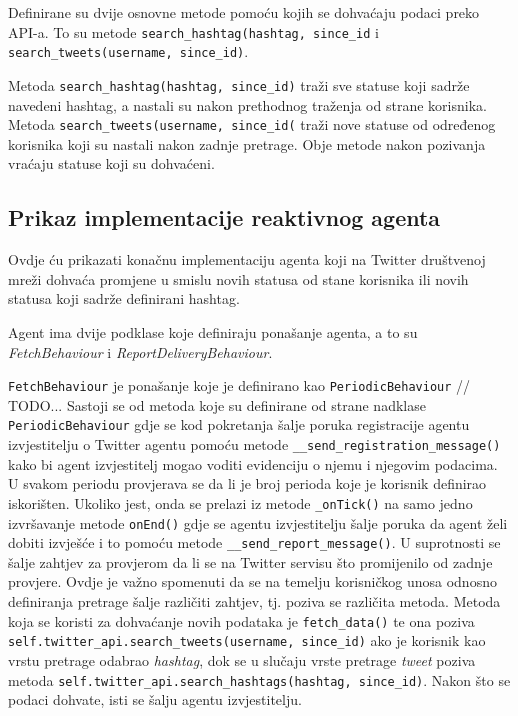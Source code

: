 \documentclass[a4paper,12pt]{foi}
\begin{document}
\lstset{commentstyle=\textit,language=python}


Definirane su dvije osnovne metode pomoću kojih se dohvaćaju podaci preko API-a. To su metode \texttt{search\_hashtag(hashtag, since\_id} i \texttt{search\_tweets(username, since\_id)}.

Metoda \texttt{search\_hashtag(hashtag, since\_id)} traži sve statuse koji sadrže navedeni hashtag, a nastali su nakon prethodnog traženja od strane korisnika. Metoda \texttt{search\_tweets(username, since\_id(} traži nove statuse od određenog korisnika koji su nastali nakon zadnje pretrage. Obje metode nakon pozivanja vraćaju statuse koji su dohvaćeni.

\subsection{Prikaz implementacije reaktivnog agenta}

Ovdje ću prikazati konačnu implementaciju agenta koji na Twitter društvenoj mreži dohvaća promjene u smislu novih statusa od stane korisnika ili novih statusa koji sadrže definirani hashtag.

\lstset{commentstyle=\textit,language=python}


Agent ima dvije podklase koje definiraju ponašanje agenta, a to su \textit{FetchBehaviour} i \textit{ReportDeliveryBehaviour}.

\texttt{FetchBehaviour} je ponašanje koje je definirano kao \texttt{PeriodicBehaviour} // TODO... Sastoji se od metoda koje su definirane od strane nadklase \texttt{PeriodicBehaviour} gdje se kod pokretanja šalje poruka registracije agentu izvjestitelju o Twitter agentu pomoću metode \texttt{\_\_send\_registration\_message()}  kako bi agent izvjestitelj mogao voditi evidenciju o njemu i njegovim podacima. U svakom periodu provjerava se da li je broj perioda koje je korisnik definirao iskorišten. Ukoliko jest, onda se prelazi iz metode \texttt{\_onTick()} na samo jedno izvršavanje metode \texttt{onEnd()} gdje se agentu izvjestitelju šalje poruka da agent želi dobiti izvješće i to pomoću metode \texttt{\_\_send\_report\_message()}. U suprotnosti se šalje zahtjev za provjerom da li se na Twitter servisu što promijenilo od zadnje provjere. Ovdje je važno spomenuti da se na temelju korisničkog unosa odnosno definiranja pretrage šalje različiti zahtjev, tj. poziva se različita metoda. Metoda koja se koristi za dohvaćanje novih podataka je \texttt{fetch\_data()} te ona poziva \texttt{self.twitter\_api.search\_tweets(username, since\_id)} ako je korisnik kao vrstu pretrage odabrao \textit{hashtag}, dok se u slučaju vrste pretrage \textit{tweet} poziva metoda \texttt{self.twitter\_api.search\_hashtags(hashtag, since\_id)}. Nakon što se podaci dohvate, isti se šalju agentu izvjestitelju.
\end{document}
